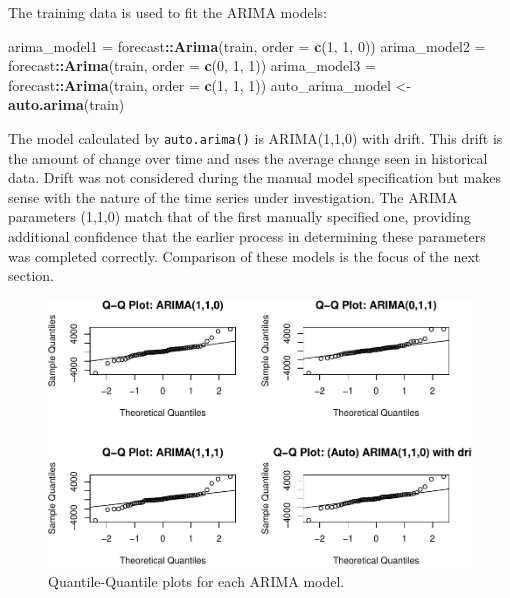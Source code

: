 \documentclass[
  12pt,
]{article}
\newenvironment{Shaded}{\begin{snugshade}}{\end{snugshade}}
\newcommand{\DataTypeTok}[1]{\textcolor[rgb]{0.13,0.29,0.53}{#1}}
\newcommand{\DecValTok}[1]{\textcolor[rgb]{0.00,0.00,0.81}{#1}}
\newcommand{\KeywordTok}[1]{\textcolor[rgb]{0.13,0.29,0.53}{\textbf{#1}}}
\newcommand{\NormalTok}[1]{#1}
\newcommand{\OperatorTok}[1]{\textcolor[rgb]{0.81,0.36,0.00}{\textbf{#1}}}
\newcommand{\StringTok}[1]{\textcolor[rgb]{0.31,0.60,0.02}{#1}}
\begin{document}
\normalsize

The training data is used to fit the ARIMA models:
\small

\begin{Shaded}
\begin{Highlighting}[]
\NormalTok{arima\_model1 =}\StringTok{ }\NormalTok{forecast}\OperatorTok{::}\KeywordTok{Arima}\NormalTok{(train, }\DataTypeTok{order =} \KeywordTok{c}\NormalTok{(}\DecValTok{1}\NormalTok{, }\DecValTok{1}\NormalTok{, }\DecValTok{0}\NormalTok{))}
\NormalTok{arima\_model2 =}\StringTok{ }\NormalTok{forecast}\OperatorTok{::}\KeywordTok{Arima}\NormalTok{(train, }\DataTypeTok{order =} \KeywordTok{c}\NormalTok{(}\DecValTok{0}\NormalTok{, }\DecValTok{1}\NormalTok{, }\DecValTok{1}\NormalTok{))}
\NormalTok{arima\_model3 =}\StringTok{ }\NormalTok{forecast}\OperatorTok{::}\KeywordTok{Arima}\NormalTok{(train, }\DataTypeTok{order =} \KeywordTok{c}\NormalTok{(}\DecValTok{1}\NormalTok{, }\DecValTok{1}\NormalTok{, }\DecValTok{1}\NormalTok{))}
\NormalTok{auto\_arima\_model \textless{}{-}}\StringTok{ }\KeywordTok{auto.arima}\NormalTok{(train)}
\end{Highlighting}
\end{Shaded}

\normalsize

The model calculated by \texttt{auto.arima()} is ARIMA(1,1,0) with drift. This drift is the amount of change over time and uses the average change seen in historical data. Drift was not considered during the manual model specification but makes sense with the nature of the time series under investigation. The ARIMA parameters (1,1,0) match that of the first manually specified one, providing additional confidence that the earlier process in determining these parameters was completed correctly. Comparison of these models is the focus of the next section.

\begin{figure}

{\centering \includegraphics[width=0.8\linewidth]{data_science_ca4_files/figure-latex/qq-plots-1} 

}

\caption{Quantile-Quantile plots for each ARIMA model.}\label{fig:qq-plots}
\end{figure}
\end{document}
